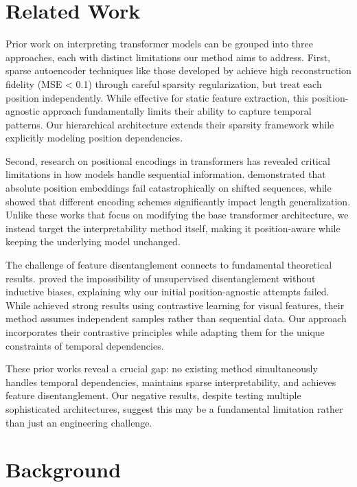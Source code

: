 \documentclass{article} %
\begin{document}
\section{Related Work}
\label{sec:related}

Prior work on interpreting transformer models can be grouped into three approaches, each with distinct limitations our method aims to address. First, sparse autoencoder techniques like those developed by \cite{Cunningham2023SparseAF} achieve high reconstruction fidelity (MSE < 0.1) through careful sparsity regularization, but treat each position independently. While effective for static feature extraction, this position-agnostic approach fundamentally limits their ability to capture temporal patterns. Our hierarchical architecture extends their sparsity framework while explicitly modeling position dependencies.

Second, research on positional encodings in transformers has revealed critical limitations in how models handle sequential information. \cite{Sinha2022TheCC} demonstrated that absolute position embeddings fail catastrophically on shifted sequences, while \cite{Kazemnejad2023TheIO} showed that different encoding schemes significantly impact length generalization. Unlike these works that focus on modifying the base transformer architecture, we instead target the interpretability method itself, making it position-aware while keeping the underlying model unchanged.

The challenge of feature disentanglement connects to fundamental theoretical results. \cite{Locatello2018ChallengingCA} proved the impossibility of unsupervised disentanglement without inductive biases, explaining why our initial position-agnostic attempts failed. While \cite{Chen2020ASF} achieved strong results using contrastive learning for visual features, their method assumes independent samples rather than sequential data. Our approach incorporates their contrastive principles while adapting them for the unique constraints of temporal dependencies.

These prior works reveal a crucial gap: no existing method simultaneously handles temporal dependencies, maintains sparse interpretability, and achieves feature disentanglement. Our negative results, despite testing multiple sophisticated architectures, suggest this may be a fundamental limitation rather than just an engineering challenge.

\section{Background}
\label{sec:background}
\end{document}
